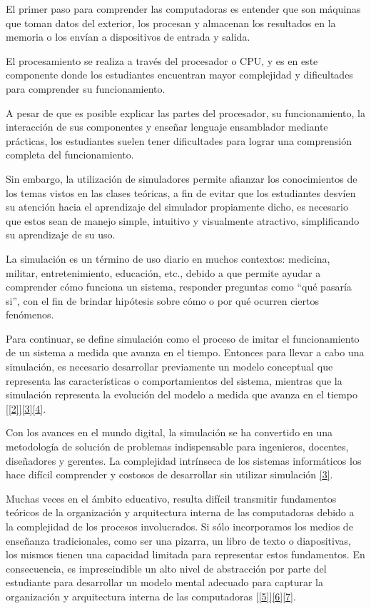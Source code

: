 \documentclass[12pt,oneside]{templates/unerthesis}
\begin{document}
El primer paso para comprender las computadoras es entender que son máquinas que toman datos del exterior, los procesan y almacenan los resultados en la memoria o los envían a dispositivos de entrada y salida.

El procesamiento se realiza a través del procesador o CPU, y es en este componente donde los estudiantes encuentran mayor complejidad y dificultades para comprender su funcionamiento.

A pesar de que es posible explicar las partes del procesador, su funcionamiento, la interacción de sus componentes y enseñar lenguaje ensamblador mediante prácticas, los estudiantes suelen tener dificultades para lograr una comprensión completa del funcionamiento.

Sin embargo, la utilización de simuladores permite afianzar los conocimientos de los temas vistos en las clases teóricas, a fin de evitar que los estudiantes desvíen su atención hacia el aprendizaje del simulador propiamente dicho, es necesario que estos sean de manejo simple, intuitivo y visualmente atractivo, simplificando su aprendizaje de su uso.

La simulación es un término de uso diario en muchos contextos: medicina, militar, entretenimiento, educación, etc., debido a que permite ayudar a comprender cómo funciona un sistema, responder preguntas como ``qué pasaría si'', con el fin de brindar hipótesis sobre cómo o por qué ocurren ciertos fenómenos.

Para continuar, se define simulación como el proceso de imitar el funcionamiento de un sistema a medida que avanza en el tiempo. Entonces para llevar a cabo una simulación, es necesario desarrollar previamente un modelo conceptual que representa las características o comportamientos del sistema, mientras que la simulación representa la evolución del modelo a medida que avanza en el tiempo {[}\protect\hyperlink{ref-banks_discrete-event_2010}{{[}2{]}}{]}\protect\hyperlink{ref-law_simulation_2015}{{[}3{]}}\protect\hyperlink{ref-robinson_simulation_2014}{{[}4{]}}.

Con los avances en el mundo digital, la simulación se ha convertido en una metodología de solución de problemas indispensable para ingenieros, docentes, diseñadores y gerentes. La complejidad intrínseca de los sistemas informáticos los hace difícil comprender y costosos de desarrollar sin utilizar simulación \protect\hyperlink{ref-law_simulation_2015}{{[}3{]}}.

Muchas veces en el ámbito educativo, resulta difícil transmitir fundamentos teóricos de la organización y arquitectura interna de las computadoras debido a la complejidad de los procesos involucrados. Si sólo incorporamos los medios de enseñanza tradicionales, como ser una pizarra, un libro de texto o diapositivas, los mismos tienen una capacidad limitada para representar estos fundamentos. En consecuencia, es imprescindible un alto nivel de abstracción por parte del estudiante para desarrollar un modelo mental adecuado para capturar la organización y arquitectura interna de las computadoras {[}\protect\hyperlink{ref-lion_simuladores_2005}{{[}5{]}}{]}\protect\hyperlink{ref-contreras_uso_2010}{{[}6{]}}\protect\hyperlink{ref-garcia-garcia_pbbcache_2020}{{[}7{]}}.
\end{document}
